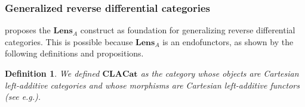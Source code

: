 \documentclass[12pt,a4paper,openright,twoside]{report}
\theoremstyle{plain}
\newtheorem{definition}[proposition]{Definition}
\theoremstyle{definition}
\begin{document}
\subsubsection{Generalized reverse differential categories}

\cite{gavranovic2024fundamental} proposes the $\mathbf{Lens}_A$ construct as foundation for generalizing reverse differential categories. This is possible because $\mathbf{Lens}_A$ is an endofunctors, as shown by the following definitions and propositions.

\begin{definition}
  We defined $\mathbf{CLACat}$ as the category whose objects are Cartesian left-additive categories and whose morphisms are Cartesian left-additive functors (see e.g.\cite{blute2006differential}).
\end{definition}
\end{document}

